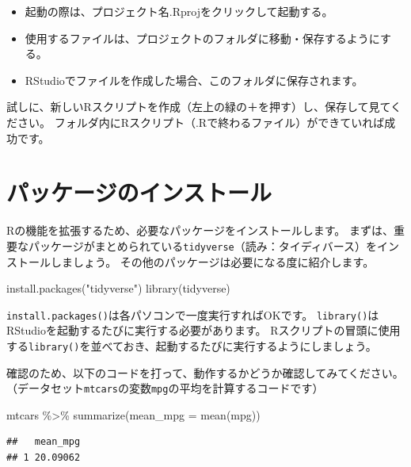 \documentclass[
]{book}
\newenvironment{Shaded}{\begin{snugshade}}{\end{snugshade}}
\newcommand{\AttributeTok}[1]{\textcolor[rgb]{0.77,0.63,0.00}{#1}}
\newcommand{\FunctionTok}[1]{\textcolor[rgb]{0.00,0.00,0.00}{#1}}
\newcommand{\NormalTok}[1]{#1}
\newcommand{\SpecialCharTok}[1]{\textcolor[rgb]{0.00,0.00,0.00}{#1}}
\newcommand{\StringTok}[1]{\textcolor[rgb]{0.31,0.60,0.02}{#1}}
\providecommand{\tightlist}{%
  \setlength{\itemsep}{0pt}\setlength{\parskip}{0pt}}
\begin{document}
\begin{itemize}
\tightlist
\item
  起動の際は、プロジェクト名.Rprojをクリックして起動する。
\item
  使用するファイルは、プロジェクトのフォルダに移動・保存するようにする。
\item
  RStudioでファイルを作成した場合、このフォルダに保存されます。
\end{itemize}

試しに、新しいRスクリプトを作成（左上の緑の＋を押す）し、保存して見てください。
フォルダ内にRスクリプト（.Rで終わるファイル）ができていれば成功です。

\hypertarget{Packages}{%
\chapter{パッケージのインストール}\label{Packages}}

Rの機能を拡張するため、必要なパッケージをインストールします。
まずは、重要なパッケージがまとめられている\texttt{tidyverse}（読み：タイディバース）をインストールしましょう。
その他のパッケージは必要になる度に紹介します。

\begin{Shaded}
\begin{Highlighting}[]
\FunctionTok{install.packages}\NormalTok{(}\StringTok{"tidyverse"}\NormalTok{)}
\FunctionTok{library}\NormalTok{(tidyverse)}
\end{Highlighting}
\end{Shaded}

\texttt{install.packages()}は各パソコンで一度実行すればOKです。
\texttt{library()}はRStudioを起動するたびに実行する必要があります。
Rスクリプトの冒頭に使用する\texttt{library()}を並べておき、起動するたびに実行するようにしましょう。

確認のため、以下のコードを打って、動作するかどうか確認してみてください。
（データセット\texttt{mtcars}の変数\texttt{mpg}の平均を計算するコードです）

\begin{Shaded}
\begin{Highlighting}[]
\NormalTok{mtcars }\SpecialCharTok{\%\textgreater{}\%} \FunctionTok{summarize}\NormalTok{(}\AttributeTok{mean\_mpg =} \FunctionTok{mean}\NormalTok{(mpg))}
\end{Highlighting}
\end{Shaded}

\begin{verbatim}
##   mean_mpg
## 1 20.09062
\end{verbatim}
\end{document}
